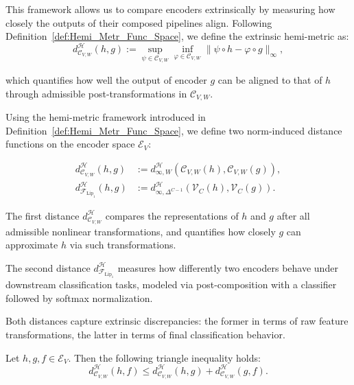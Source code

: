 This framework allows us to compare encoders extrinsically by measuring how closely the outputs of their composed pipelines align. 
Following Definition~\ref{def:Hemi_Metr_Func_Space}, we define the extrinsic hemi-metric as:
\[
d^{\mathcal{H}}_{\mathcal{C}_{V,W}}(h, g) := \sup_{\psi \in \mathcal{C}_{V,W}} \inf_{\varphi \in \mathcal{C}_{V,W}} \|  \psi \circ h - \varphi \circ g \|_\infty,
\]

which quantifies how well the output of encoder \( g \) can be aligned to that of \( h \) through admissible post-transformations in \( \mathcal{C}_{V,W} \).  


\begin{definition}
Using the hemi-metric framework introduced in Definition~\ref{def:Hemi_Metr_Func_Space}, we define two norm-induced distance functions on the encoder space \( \mathcal{E}_V \):

\begin{align*}
d^\mathcal{H}_{\mathcal{C}_{V,W}}(h,g) &:= d^\mathcal{H}_{\infty, W}\left( \mathcal{C}_{V,W}(h), \mathcal{C}_{V,W}(g) \right), \\
d_{\mathcal{F}_{\mathrm{Lip}_1}}^{\mathcal{H}}(h,g) &:= d^\mathcal{H}_{\infty, \Delta^{C-1}}\left( \mathcal{V}_C(h), \mathcal{V}_C(g) \right).
\end{align*}
\end{definition}
The first distance \( d^\mathcal{H}_{\mathcal{C}_{V,W}} \) compares the representations of \( h \) and \( g \) after all admissible nonlinear transformations, and quantifies how closely \( g \) can approximate \( h \) via such transformations.

The second distance \( d_{\mathcal{F}_{\mathrm{Lip}_1}}^{\mathcal{H}} \) measures how differently two encoders behave under downstream classification tasks, modeled via post-composition with a classifier followed by softmax normalization.

Both distances capture extrinsic discrepancies: the former in terms of raw feature transformations, the latter in terms of final classification behavior.


\begin{proposition}
Let \( h, g, f \in \mathcal{E}_V \). 
Then the following triangle inequality holds:
\[
d^\mathcal{H}_{\mathcal{C}_{V,W}}(h,f) \leq d^\mathcal{H}_{\mathcal{C}_{V,W}}(h,g) + d^\mathcal{H}_{\mathcal{C}_{V,W}}(g,f).
\]
\end{proposition}



